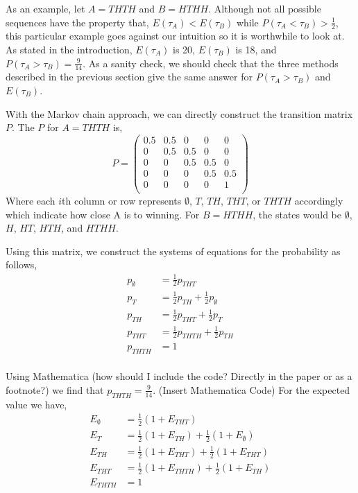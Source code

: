 \documentclass{article}
\numberwithin{mytheorem}{subsection} %
\begin{document}
		As an example, let $A = THTH$ and $B = HTHH$. Although not all possible sequences have the property that, $E(\tau_A) < E(\tau_B)$ while $P(\tau_A < \tau_B) > \frac{1}{2}$, this particular example goes against our intuition so it is worthwhile to look at. As stated in the introduction, $E(\tau_A)$ is 20, $E(\tau_B)$ is 18, and $P(\tau_A > \tau_B) = \frac{9}{14}$. As a sanity check, we should check that the three methods described in the previous section give the same answer for $P(\tau_A > \tau_B)$ and $E(\tau_B)$. 

		With the Markov chain approach, we can directly construct the transition matrix $P$. The $P$ for $A=THTH$ is,
		\begin{equation} 	
			P= \left(
			\begin{array}{ccccc}
			 0.5 & 0.5 & 0 & 0 & 0 \\
			 0 & 0.5 & 0.5 & 0 & 0 \\
			 0 & 0 & 0.5 & 0.5 & 0 \\
			 0 & 0 & 0 & 0.5 & 0.5 \\
			 0 & 0 & 0 & 0 & 1 \\
			\end{array}
			\right)
		\end{equation}
		Where each $i$th column or row represents $\emptyset$, $T$, $TH$, $THT$, or $THTH$ accordingly which indicate how close A is to winning. For $B = HTHH$, the states would be $\emptyset$, $H$, $HT$, $HTH$, and $HTHH$.

		Using this matrix, we construct the systems of equations for the probability as follows,
		\begin{equation} 	
		\begin{split}
		p_{\emptyset} & = \frac{1}{2} p_{THT} \\
		p_{T} & = \frac{1}{2} p_{TH} + \frac{1}{2} p_{\emptyset} \\
		p_{TH} & = \frac{1}{2} p_{THT} + \frac{1}{2} p_T \\
		p_{THT} & = \frac{1}{2} p_{THTH} + \frac{1}{2} p_{TH} \\
		p_{THTH} & = 1 \\
		\end{split}
		\end{equation}

		Using Mathematica (how should I include the code? Directly in the paper or as a footnote?) we find that $p_{THTH} = \frac{9}{14}$. (Insert Mathematica Code) For the expected value we have,
		\begin{equation} 	
		\begin{split}
		E_{\emptyset} & = \frac{1}{2} (1 + E_{THT}) \\
		E_{T} & = \frac{1}{2} (1 + E_{TH}) + \frac{1}{2} (1 + E_{\emptyset}) \\
		E_{TH} & = \frac{1}{2} (1 + E_{THT}) + \frac{1}{2} (1 + E_{THT}) \\
		E_{THT} & = \frac{1}{2} (1 + E_{THTH}) + \frac{1}{2} (1 + E_{TH}) \\
		E_{THTH} & = 1 \\
		\end{split}
		\end{equation}
\end{document}

